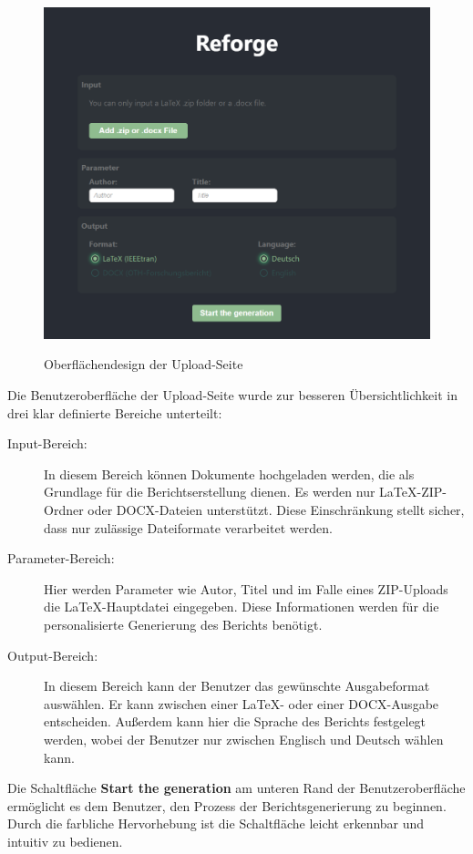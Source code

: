 \begin{figure}[H]
\centering
\includegraphics[width=0.9\linewidth]{Images/Frontend Design.png}\\
\caption{Oberflächendesign der Upload-Seite}
\label{fig:Frontend_Design_Upload}
\end{figure}

Die Benutzeroberfläche der Upload-Seite wurde zur besseren Übersichtlichkeit in drei klar definierte Bereiche unterteilt:    
\begin{description}
    \item[Input-Bereich:]
    In diesem Bereich können Dokumente hochgeladen werden, die als Grundlage für die Berichtserstellung dienen. Es werden nur LaTeX-ZIP-Ordner oder \ac{DOCX}-Dateien unterstützt. Diese Einschränkung stellt sicher, dass nur zulässige Dateiformate verarbeitet werden.
    \item[Parameter-Bereich:] 
    Hier werden Parameter wie Autor, Titel und im Falle eines ZIP-Uploads die LaTeX-Hauptdatei eingegeben. Diese Informationen werden für die personalisierte Generierung des Berichts benötigt.
    \item[Output-Bereich:]
    In diesem Bereich kann der Benutzer das gewünschte Ausgabeformat auswählen. Er kann zwischen einer LaTeX- oder einer \ac{DOCX}-Ausgabe entscheiden. Außerdem kann hier die Sprache des Berichts festgelegt werden, wobei der Benutzer nur zwischen Englisch und Deutsch wählen kann.
\end{description}

Die Schaltfläche \textbf{Start the generation} am unteren Rand der Benutzeroberfläche ermöglicht es dem Benutzer, den Prozess der Berichtsgenerierung zu beginnen. Durch die farbliche Hervorhebung ist die Schaltfläche leicht erkennbar und intuitiv zu bedienen.

